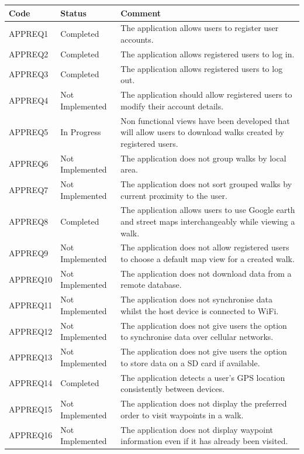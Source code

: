 \documentclass[11pt,a4paper]{article}
\begin{document}
\begin{longtable}{ p{}|p{}|p{} }
\textbf{Code} & \textbf{Status} & \textbf{Comment} \\
\hline
APPREQ1 & Completed & The application allows users to register user accounts. \\ \hline
APPREQ2 & Completed & The application allows registered users to log in. \\ \hline
APPREQ3 & Completed & The application allows registered users to log out. \\ \hline
APPREQ4 & Not Implemented & The application should allow registered users to modify their account details. \\ \hline
APPREQ5 & In Progress & Non functional views have been developed that will allow users to download walks created by registered users. \\ \hline
APPREQ6 & Not Implemented & The application does not group walks by local area. \\ \hline
APPREQ7 & Not Implemented & The application does not sort grouped walks by current proximity to the user. \\ \hline
APPREQ8 & Completed & The application allows users to use Google earth and street maps interchangeably while viewing a walk. \\ \hline
APPREQ9 & Not Implemented & The application does not allow registered users to choose a default map view for a created walk. \\ \hline
APPREQ10 & Not Implemented & The application does not download data from a remote database. \\ \hline
APPREQ11 & Not Implemented & The application does not synchronise data whilst the host device is connected to WiFi. \\ \hline
APPREQ12 & Not Implemented & The application does not give users the option to synchronise data over cellular networks. \\ \hline
APPREQ13 & Not Implemented & The application does not give users the option to store data on a SD card if available. \\ \hline
APPREQ14 & Completed &  The application detects a user's GPS location consistently between devices. \\ \hline
APPREQ15 & Not Implemented & The application does not display the preferred order to visit waypoints in a walk. \\ \hline
APPREQ16 & Not Implemented & The application does not display waypoint information even if it has already been visited. \\ \hline

\end{longtable}
\end{document}
